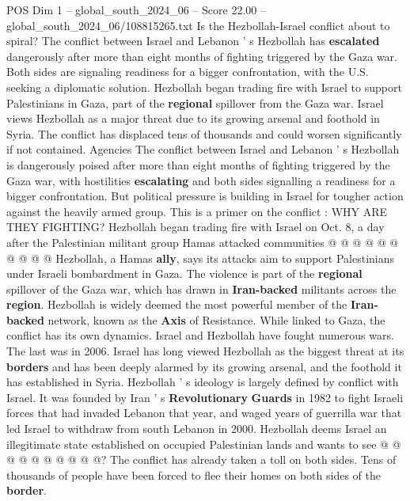 \begin{textsample}{POS Dim 1 – global\_south\_2024\_06 – Score 22.00 – global\_south\_2024\_06/108815265.txt}  \label{ex:f1_pos_135}
Is the Hezbollah-Israel conflict about to spiral?
The conflict between Israel and Lebanon ' s Hezbollah has \textbf{escalated} dangerously after more than eight months of fighting triggered by the Gaza war.
Both sides are signaling readiness for a bigger confrontation, with the U.S. seeking a diplomatic solution.
Hezbollah began trading fire with Israel to support Palestinians in Gaza, part of the \textbf{regional} spillover from the Gaza war.
Israel views Hezbollah as a major threat due to its growing arsenal and foothold in Syria.
The conflict has displaced tens of thousands and could worsen significantly if not contained.
Agencies The conflict between Israel and Lebanon ' s Hezbollah is dangerously poised after more than eight months of fighting triggered by the Gaza war, with hostilities \textbf{escalating} and both sides signalling a readiness for a bigger confrontation.
But political pressure is building in Israel for tougher action against the heavily armed group.
This is a primer on the conflict : WHY ARE THEY FIGHTING?
Hezbollah began trading fire with Israel on Oct. 8, a day after the Palestinian militant group Hamas attacked communities @ @ @ @ @ @ @ @ @ @ Hezbollah, a Hamas \textbf{ally}, says its attacks aim to support Palestinians under Israeli bombardment in Gaza.
The violence is part of the \textbf{regional} spillover of the Gaza war, which has drawn in \textbf{Iran-backed} militants across the \textbf{region}.
Hezbollah is widely deemed the most powerful member of the \textbf{Iran-backed} network, known as the \textbf{Axis} of Resistance.
While linked to Gaza, the conflict has its own dynamics.
Israel and Hezbollah have fought numerous wars.
The last was in 2006.
Israel has long viewed Hezbollah as the biggest threat at its \textbf{borders} and has been deeply alarmed by its growing arsenal, and the foothold it has established in Syria.
Hezbollah ' s ideology is largely defined by conflict with Israel.
It was founded by Iran ' s \textbf{Revolutionary} \textbf{Guards} in 1982 to fight Israeli forces that had invaded Lebanon that year, and waged years of guerrilla war that led Israel to withdraw from south Lebanon in 2000.
Hezbollah deems Israel an illegitimate state established on occupied Palestinian lands and wants to see @ @ @ @ @ @ @ @ @ @?
The conflict has already taken a toll on both sides.
Tens of thousands of people have been forced to flee their homes on both sides of the \textbf{border}.

\end{textsample}
